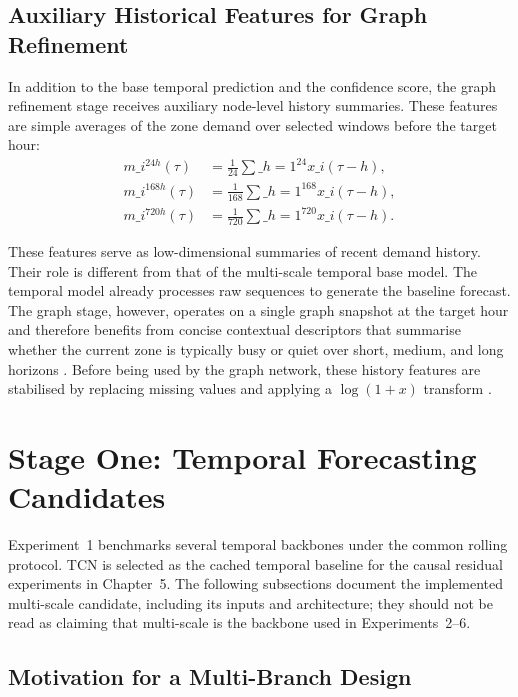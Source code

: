 \documentclass[12pt,a4paper]{report}
\begin{document}
\subsection{Auxiliary Historical Features for Graph Refinement}

In addition to the base temporal prediction and the confidence score, the graph refinement stage receives auxiliary node-level history summaries. These features are simple averages of the zone demand over selected windows before the target hour:
\begin{align*}
	m\_i^{24h}(\tau) &= \frac{1}{24}\sum\_{h=1}^{24} x\_i(\tau-h),\\
	m\_i^{168h}(\tau) &= \frac{1}{168}\sum\_{h=1}^{168} x\_i(\tau-h),\\
	m\_i^{720h}(\tau) &= \frac{1}{720}\sum\_{h=1}^{720} x\_i(\tau-h).
\end{align*}

These features serve as low-dimensional summaries of recent demand history. Their role is different from that of the multi-scale temporal base model. The temporal model already processes raw sequences to generate the baseline forecast. The graph stage, however, operates on a single graph snapshot at the target hour and therefore benefits from concise contextual descriptors that summarise whether the current zone is typically busy or quiet over short, medium, and long horizons \cite{lyu2021bigdata,lim2021survey}. Before being used by the graph network, these history features are stabilised by replacing missing values and applying a \(\log(1+x)\) transform \cite{akram2023counts}.


\section{Stage One: Temporal Forecasting Candidates}
\label{sec:temporal-stage}

Experiment~1 benchmarks several temporal backbones under the common rolling protocol. TCN is selected as the cached temporal baseline for the causal residual experiments in Chapter~5. The following subsections document the implemented multi-scale candidate, including its inputs and architecture; they should not be read as claiming that multi-scale is the backbone used in Experiments~2--6.

\subsection{Motivation for a Multi-Branch Design}
\end{document}
